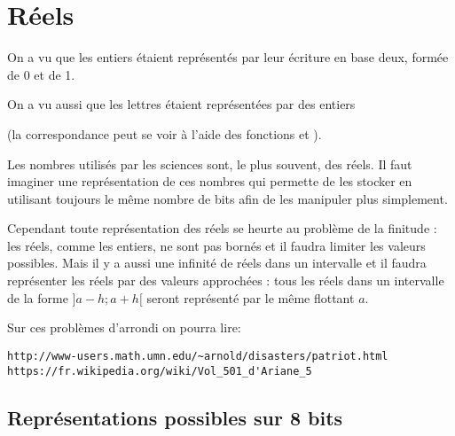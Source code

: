 \chapter{Réels}
\thispagestyle{empty}
On a vu que les entiers étaient représentés par leur écriture en base deux, formée de 0 et de 1.

On a vu aussi que les lettres étaient représentées par des entiers 

(la correspondance peut se voir à l'aide des fonctions  et ).

Les nombres utilisés par les sciences sont, le plus souvent, des réels. Il faut imaginer une représentation de ces nombres qui permette de les stocker en utilisant toujours le même nombre de bits afin de les manipuler plus simplement.

Cependant toute représentation des réels se heurte au problème de la finitude : les réels, comme les entiers, ne sont pas bornés et il faudra limiter les valeurs possibles. Mais il y a aussi une infinité de réels dans un intervalle et il faudra représenter les réels par des valeurs approchées : tous les réels dans un intervalle de la forme $]a-h;a+h[$ seront représenté par le même flottant $a$.

\medskip
Sur ces problèmes d'arrondi on pourra lire: 
\begin{lstlisting}
http://www-users.math.umn.edu/~arnold/disasters/patriot.html 
https://fr.wikipedia.org/wiki/Vol_501_d'Ariane_5 
\end{lstlisting}
\section{Représentations possibles sur 8 bits}

